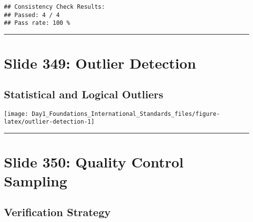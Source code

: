 \documentclass[
]{article}
\begin{document}
\begin{verbatim}
## Consistency Check Results:
## Passed: 4 / 4 
## Pass rate: 100 %
\end{verbatim}

\begin{center}\rule{0.5\linewidth}{0.5pt}\end{center}

\section{Slide 349: Outlier
Detection}\label{slide-349-outlier-detection}

\subsection{Statistical and Logical
Outliers}\label{statistical-and-logical-outliers}

\texttt{[image: Day1\_Foundations\_International\_Standards\_files/figure-latex/outlier-detection-1]}

\begin{center}\rule{0.5\linewidth}{0.5pt}\end{center}

\section{Slide 350: Quality Control
Sampling}\label{slide-350-quality-control-sampling}

\subsection{Verification Strategy}\label{verification-strategy}
\end{document}
